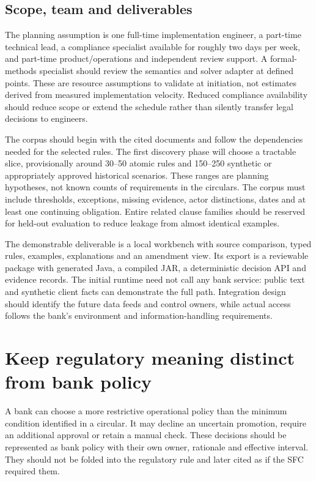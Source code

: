 \documentclass[12pt,a4paper,oneside,openany]{book}
\begin{document}
\subsection{Scope, team and deliverables}
\label{merge:P-04-prototype:01}


The planning assumption is one full-time implementation engineer, a part-time
technical lead, a compliance specialist available for roughly two days per week, and
part-time product/operations and independent review support. A formal-methods
specialist should review the semantics and solver adapter at defined points.
These are resource assumptions to validate at initiation, not estimates derived
from measured implementation velocity. Reduced compliance availability should
reduce scope or extend the schedule rather than silently transfer legal decisions
to engineers.

The corpus should begin with the cited documents and follow the dependencies
needed for the selected rules. The first discovery phase will choose a tractable
slice, provisionally around 30--50 atomic rules and 150--250 synthetic or
appropriately approved historical scenarios. These ranges are planning hypotheses,
not known counts of requirements in the circulars. The corpus must include
thresholds, exceptions, missing evidence, actor distinctions, dates and at least
one continuing obligation. Entire related clause families should be reserved for
held-out evaluation to reduce leakage from almost identical examples.

The demonstrable deliverable is a local workbench with source comparison, typed
rules, examples, explanations and an amendment view. Its export is a reviewable
package with generated Java, a compiled JAR, a deterministic decision API and
evidence records. The initial runtime need not call any bank service: public text and synthetic client facts
can demonstrate the full path. Integration design should identify the future
data feeds and control owners, while actual access follows the bank's environment
and information-handling requirements.

\section{Keep regulatory meaning distinct from bank policy}
\label{merge:M10:02}


A bank can choose a more restrictive operational policy than the minimum condition
identified in a circular. It may decline an uncertain promotion, require an
additional approval or retain a manual check. These decisions should be represented
as bank policy with their own owner, rationale and effective interval. They should
not be folded into the regulatory rule and later cited as if the SFC required them.
\end{document}
